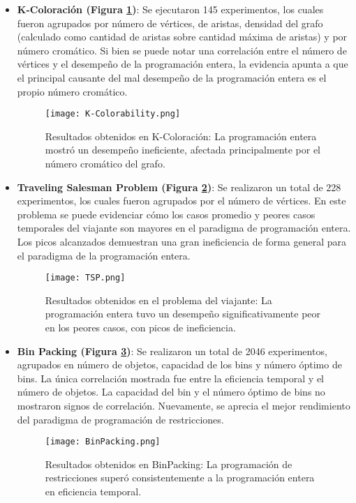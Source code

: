 \documentclass[12pt]{report}
\begin{document}
\begin{itemize}
    \item \textbf{K-Coloración (Figura \ref{fig:K-Colorability})}: Se ejecutaron 145 experimentos, los cuales fueron agrupados por número de vértices, de aristas, densidad del grafo (calculado como cantidad de aristas sobre cantidad máxima de aristas) y por número cromático. Si bien se puede notar una correlación entre el número de vértices y el desempeño de la programación entera, la evidencia apunta a que el principal causante del mal desempeño de la programación entera es el propio número cromático.
    \begin{figure}[ht]
    \centering
    \texttt{[image: K-Colorability.png]}
    \caption{Resultados obtenidos en K-Coloración: La programación entera mostró un desempeño ineficiente, afectada principalmente por el número cromático del grafo.}
    \label{fig:K-Colorability}
    \end{figure}

\newpage
    
    \item \textbf{Traveling Salesman Problem (Figura \ref{fig:TSP})}: Se realizaron un total de 228 experimentos, los cuales fueron agrupados por el número de vértices. En este problema se puede evidenciar cómo los casos promedio y peores casos temporales del viajante son mayores en el paradigma de programación entera. Los picos alcanzados demuestran una gran ineficiencia de forma general para el paradigma de la programación entera.
    \begin{figure}[ht]
    \centering
    \texttt{[image: TSP.png]}
    \caption{Resultados obtenidos en el problema del viajante: La programación entera tuvo un desempeño significativamente peor en los peores casos, con picos de ineficiencia.}
    \label{fig:TSP}
    \end{figure}

\newpage

    \item \textbf{Bin Packing (Figura \ref{fig:BinPacking})}: Se realizaron un total de 2046 experimentos, agrupados en número de objetos, capacidad de los bins y número óptimo de bins. La única correlación mostrada fue entre la eficiencia temporal y el número de objetos. La capacidad del bin y el número óptimo de bins no mostraron signos de correlación. Nuevamente, se aprecia el mejor rendimiento del paradigma de programación de restricciones. 
    \begin{figure}[ht]
    \centering
    \texttt{[image: BinPacking.png]}
    \caption{Resultados obtenidos en BinPacking: La programación de restricciones superó consistentemente a la programación entera en eficiencia temporal.}
    \label{fig:BinPacking}
    \end{figure}


\end{itemize}
\end{document}
